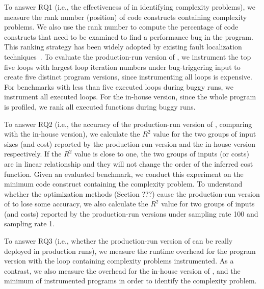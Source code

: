 To answer RQ1 (i.e., the effectiveness of  \Tool in identifying
complexity problems), we measure the rank number (position) of code
constructs containing complexity problems. We also use the rank number
to compute the percentage of code constructs
that need to be examined to find a performance bug in the program.
This ranking strategy has been widely adopted by existing fault localization 
techniques~\cite{Jones05,Cleve05}.
To evaluate the production-run version of \Tool,
we instrument the top five loops with largest loop 
iteration numbers under bug-triggering input to create five distinct program versions, 
since instrumenting all loops is expensive. 
For benchmarks with less than five executed 
loops during buggy runs, 
we instrument all executed loops.  
For the in-house version, since the whole program is profiled, 
we rank all executed functions during buggy runs. 

To answer RQ2 (i.e., the accuracy of the production-run version of \Tool, 
comparing with the in-house version),
we calculate the $R^2$ value for the two groups of input sizes (and cost) reported by 
the production-run version
and the in-house version respectively.
If the $R^2$ value is close to one, the two groups of inputs (or costs) 
are in linear relationship and they will not change 
the order of the inferred cost function. 
Given an evaluated benchmark, we conduct this experiment 
on the minimum
code construct containing the complexity problem.
To understand whether the optimization methods
(Section ???) cause the production-run version of \Tool 
to lose some accuracy, we also calculate the $R^2$ value for two groups 
of inputs (and costs) reported by the production-run versions 
under sampling rate 100 and sampling rate 1. 

To answer RQ3 (i.e., whether the production-run version of \Tool 
can be really deployed in production runs), 
we measure the runtime overhead for the program version 
with the loop containing complexity problems instrumented. 
As a contrast, we also measure the overhead for the in-house version of \Tool, 
and the minimum of instrumented programs in order 
to identify the complexity problem.  


